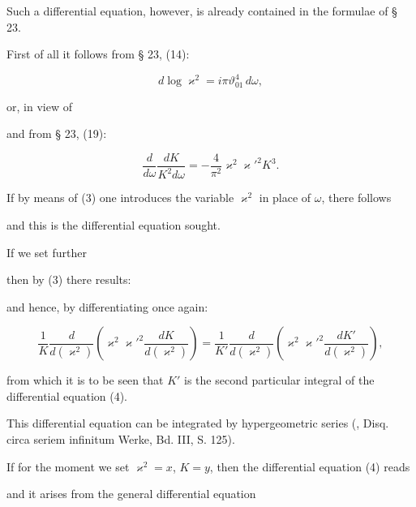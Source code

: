 
Such a differential equation, however, is already contained in the formulae of § 23.

First of all it follows from § 23, (14):

\[
d\log \varkappa^2 = i\pi\vartheta_{01}^4\,d\omega,
\]

or, in view of



and from § 23, (19):

\[
\frac{d}{d\omega}\frac{dK}{K^2d\omega} = -\frac{4}{\pi^2}\varkappa^2\varkappa'^2K^3.
\]

If by means of (3) one introduces the variable $\varkappa^2$ in place of $\omega$, there follows


and this is the differential equation sought.

If we set further



then by (3) there results:


and hence, by differentiating once again:

\[
\frac1K\frac{d}{d(\varkappa^2)}\left(\varkappa^2\varkappa'^2\frac{dK}{d(\varkappa^2)}\right) = \frac{1}{K'}\frac{d}{d(\varkappa^2)}\left(\varkappa^2\varkappa'^2\frac{dK'}{d(\varkappa^2)}\right),
\]

from which it is to be seen that $K'$ is the second particular integral of the differential equation (4).

This differential equation can be integrated by hypergeometric series (, Disq. circa seriem infinitum Werke, Bd. III, S. 125).

If for the moment we set $\varkappa^2 = x$, $K = y$, then the differential equation (4) reads


and it arises from the general  differential equation

